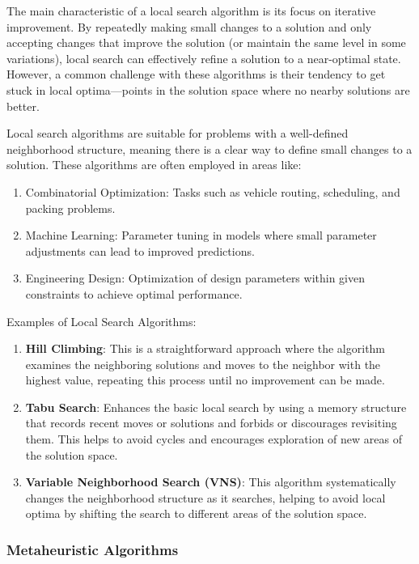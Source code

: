 \documentclass[
]{article}
\begin{document}
    The main characteristic of a local search algorithm is its focus on iterative improvement. By repeatedly making small changes to a solution and only accepting changes that improve the solution (or maintain the same level in some variations), local search can effectively refine a solution to a near-optimal state. However, a common challenge with these algorithms is their tendency to get stuck in local optima—points in the solution space where no nearby solutions are better.

    Local search algorithms are suitable for problems with a well-defined neighborhood structure, meaning there is a clear way to define small changes to a solution. These algorithms are often employed in areas like:

    \begin{enumerate}
        \item Combinatorial Optimization: Tasks such as vehicle routing, scheduling, and packing problems.
        \item Machine Learning: Parameter tuning in models where small parameter adjustments can lead to improved predictions.
        \item Engineering Design: Optimization of design parameters within given constraints to achieve optimal performance.
    \end{enumerate}

    Examples of Local Search Algorithms:
    \begin{enumerate}
        \item \textbf{Hill Climbing}: This is a straightforward approach where the algorithm examines the neighboring solutions and moves to the neighbor with the highest value, repeating this process until no improvement can be made.
        \item \textbf{Tabu Search}: Enhances the basic local search by using a memory structure that records recent moves or solutions and forbids or discourages revisiting them. This helps to avoid cycles and encourages exploration of new areas of the solution space.
        \item \textbf{Variable Neighborhood Search (VNS)}: This algorithm systematically changes the neighborhood structure as it searches, helping to avoid local optima by shifting the search to different areas of the solution space.
    \end{enumerate}


    \hypertarget{metaheuristic-algorithms}{%

        \subsubsection{Metaheuristic Algorithms}\label{itm:metaheuristic-algorithms}}
\end{document}
